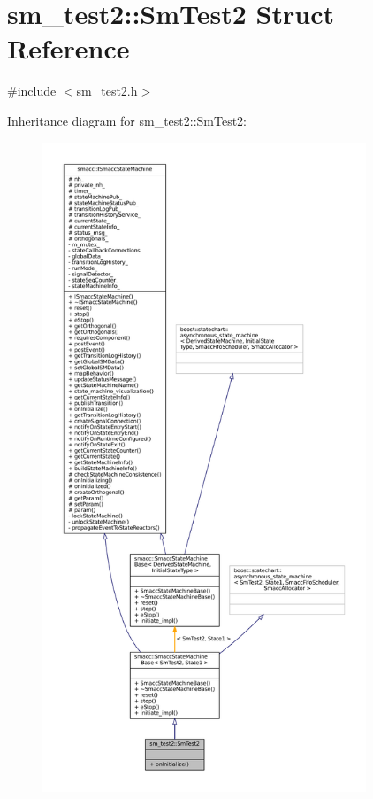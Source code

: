 \hypertarget{structsm__test2_1_1SmTest2}{}\section{sm\+\_\+test2\+:\+:Sm\+Test2 Struct Reference}
\label{structsm__test2_1_1SmTest2}


{\ttfamily \#include $<$sm\+\_\+test2.\+h$>$}



Inheritance diagram for sm\+\_\+test2\+:\+:Sm\+Test2\+:
\nopagebreak
\begin{figure}[H]
\begin{center}
\leavevmode
\includegraphics[height=550pt]{structsm__test2_1_1SmTest2__inherit__graph}
\end{center}
\end{figure}



